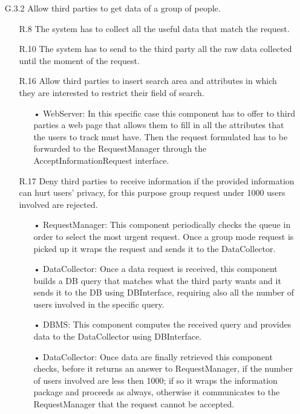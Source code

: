 \begin{enumerate}
\item [G.3.2] Allow third parties to get data of a group of people.
	\begin{enumerate}
	\item [R.8] The system has to collect all the useful data that match the request.
		\item [R.10] The system has to send to the third party all the raw data collected until the moment of the request.
	\item [R.16] Allow third parties to insert search area and attributes in which they are interested to restrict their field of search.
		\begin{enumerate}
		\item[•] WebServer: In this specific case this component has to offer to third parties a web page that allows them to fill in all the attributes that the users to track must have. Then the request formulated has to be forwarded to the RequestManager through the AcceptInformationRequest interface.
		\end{enumerate}	
		
	\item [R.17] Deny third parties to receive information if the provided information can hurt users' privacy, for this purpose group request under 1000 users involved are rejected.
		\begin{enumerate}
		\item[•] RequestManager: This component periodically checks the queue in order to select the most urgent request. Once a group mode request is picked up it wraps the request and sends it to the DataCollector.
		\item[•] DataCollector: Once a data request is received, this component builds a DB query that matches what the third party wants and it sends it to the DB using DBInterface, requiring also all the number of users involved in the specific query.
		\item[•] DBMS: This component computes the received query and provides data to the DataCollector using DBInterface.
		\item[•] DataCollector: Once data are finally retrieved this component checks, before it returns an answer to RequestManager, if the number of users involved are less then 1000; if so it wraps the information package and proceeds as always, otherwise it communicates to the RequestManager that the request cannot be accepted.
		\end{enumerate}	

	\end{enumerate}
	

\end{enumerate}
